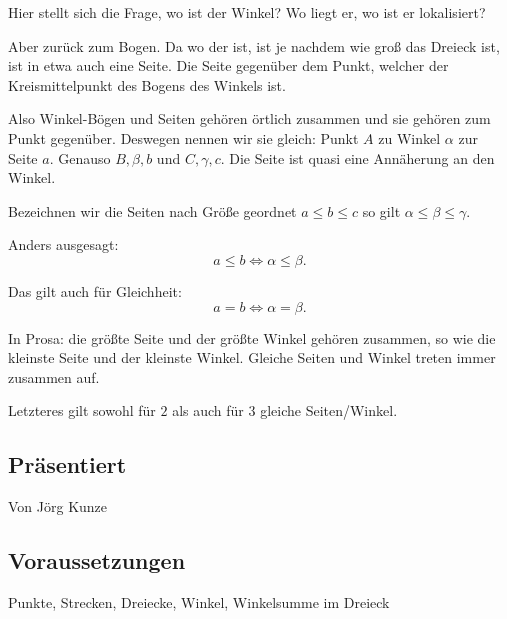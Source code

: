\documentclass[a4paper]{amsart}
\theoremstyle{definition}
\begin{document}
Hier stellt sich die Frage, wo ist der Winkel? Wo liegt er, wo ist er lokalisiert?

Aber zurück zum Bogen. Da wo der ist, ist je nachdem wie groß das Dreieck ist, ist in etwa auch eine Seite. Die Seite gegenüber dem Punkt, welcher der Kreismittelpunkt des Bogens des Winkels ist.

Also Winkel-Bögen und Seiten gehören örtlich zusammen und sie gehören zum Punkt gegenüber. Deswegen nennen wir sie gleich: Punkt $A$ zu Winkel $\alpha$ zur Seite $a$. Genauso $B, \beta, b$ und $C, \gamma, c$. Die Seite ist quasi eine Annäherung an den Winkel.

Bezeichnen wir die Seiten nach Größe geordnet $a \le b \le c$ so gilt $\alpha \le \beta \le \gamma$.

Anders ausgesagt:
\begin{equation}\label{vergleich}
   a \le b \Leftrightarrow \alpha \le \beta.
\end{equation}

Das gilt auch für Gleichheit:
\begin{equation}\label{gleich}
   a = b \Leftrightarrow \alpha = \beta.
\end{equation}

In Prosa: die größte Seite und der größte Winkel gehören zusammen, so wie die kleinste Seite und der kleinste Winkel. Gleiche Seiten und Winkel treten immer zusammen auf.

Letzteres gilt sowohl für $2$ als auch für $3$ gleiche Seiten/Winkel.

\subsection*{Präsentiert}
Von Jörg Kunze

\subsection*{Voraussetzungen}
Punkte, Strecken, Dreiecke, Winkel, Winkelsumme im Dreieck

\end{document}
